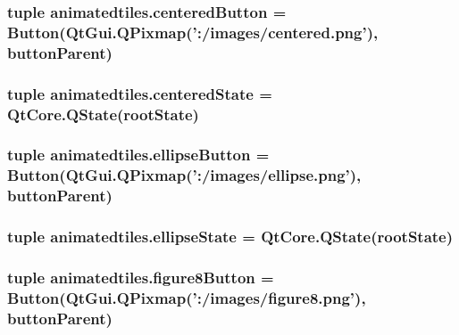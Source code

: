 \subsubsection[{centered\+Button}]{\setlength{\rightskip}{0pt plus 5cm}tuple animatedtiles.\+centered\+Button = {\bf Button}(Qt\+Gui.\+Q\+Pixmap('\+:/images/centered.\+png'), {\bf button\+Parent})}\label{namespaceanimatedtiles_ad5df798c7a5a8010105ea14f490b0ecb}
\hypertarget{namespaceanimatedtiles_ad21e801dab06e28392c0875afd93ef03}{}
\subsubsection[{centered\+State}]{\setlength{\rightskip}{0pt plus 5cm}tuple animatedtiles.\+centered\+State = Qt\+Core.\+Q\+State({\bf root\+State})}\label{namespaceanimatedtiles_ad21e801dab06e28392c0875afd93ef03}
\hypertarget{namespaceanimatedtiles_ae9dbcba2b943c792e520691ff1e8915b}{}
\subsubsection[{ellipse\+Button}]{\setlength{\rightskip}{0pt plus 5cm}tuple animatedtiles.\+ellipse\+Button = {\bf Button}(Qt\+Gui.\+Q\+Pixmap('\+:/images/ellipse.\+png'), {\bf button\+Parent})}\label{namespaceanimatedtiles_ae9dbcba2b943c792e520691ff1e8915b}
\hypertarget{namespaceanimatedtiles_a813aeb66dcd12d899ba169f96a288f6f}{}
\subsubsection[{ellipse\+State}]{\setlength{\rightskip}{0pt plus 5cm}tuple animatedtiles.\+ellipse\+State = Qt\+Core.\+Q\+State({\bf root\+State})}\label{namespaceanimatedtiles_a813aeb66dcd12d899ba169f96a288f6f}
\hypertarget{namespaceanimatedtiles_aa14f616cce5bc55fa4986ff9302aa5a1}{}
\subsubsection[{figure8\+Button}]{\setlength{\rightskip}{0pt plus 5cm}tuple animatedtiles.\+figure8\+Button = {\bf Button}(Qt\+Gui.\+Q\+Pixmap('\+:/images/figure8.\+png'), {\bf button\+Parent})}\label{namespaceanimatedtiles_aa14f616cce5bc55fa4986ff9302aa5a1}
\hypertarget{namespaceanimatedtiles_a9b166216b863ae0be32c5d7da097fa14}{}
